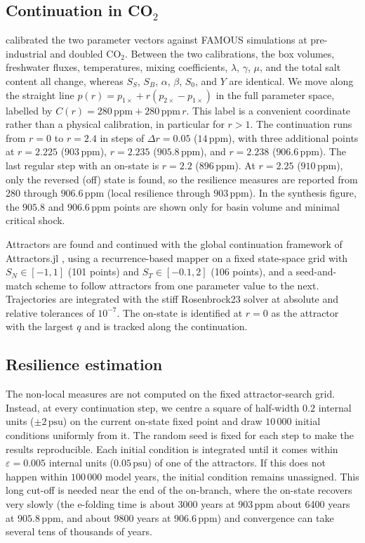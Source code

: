 \documentclass[12pt, a4paper]{article}
\newcommand{\psu}{\,\text{psu}}
\newcommand{\CO}{CO\ensuremath{_2}}
\begin{document}
\subsection*{Continuation in \CO{}}

\citet{Wood20195BoxModel} calibrated the two parameter vectors against FAMOUS simulations at pre-industrial and doubled \CO{}. Between the two calibrations, the box volumes, freshwater fluxes, temperatures, mixing coefficients, $\lambda$, $\gamma$, $\mu$, and the total salt content all change, whereas $S_S$, $S_B$, $\alpha$, $\beta$, $S_0$, and $Y$ are identical. We move along the straight line $p(r)=p_{1\times}+r(p_{2\times}-p_{1\times})$ in the full parameter space, labelled by $C(r)=280\,\text{ppm}+280\,\text{ppm}\,r$. This label is a convenient coordinate rather than a physical calibration, in particular for $r>1$. The continuation runs from $r=0$ to $r=2.4$ in steps of $\Delta r=0.05$ ($14\,\text{ppm}$), with three additional points at $r=2.225$ ($903\,\text{ppm}$), $r=2.235$ ($905.8\,\text{ppm}$), and $r=2.238$ ($906.6\,\text{ppm}$). The last regular step with an on-state is $r=2.2$ ($896\,\text{ppm}$). At $r=2.25$ ($910\,\text{ppm}$), only the reversed (off) state is found, so the resilience measures are reported from 280 through $906.6\,\text{ppm}$ (local resilience through $903\,\text{ppm}$). In the synthesis figure, the $905.8$ and $906.6\,\text{ppm}$ points are shown only for basin volume and minimal critical shock.

Attractors are found and continued with the global continuation framework of Attractors.jl \citep{Datseris2023FrameworkGlobalStability}, using a recurrence-based mapper on a fixed state-space grid with $S_N\in[-1,1]$ (101 points) and $S_T\in[-0.1,2]$ (106 points), and a seed-and-match scheme to follow attractors from one parameter value to the next. Trajectories are integrated with the stiff Rosenbrock23 solver at absolute and relative tolerances of $10^{-7}$. The on-state is identified at $r=0$ as the attractor with the largest $q$ and is tracked along the continuation.

\subsection*{Resilience estimation}

The non-local measures are not computed on the fixed attractor-search grid. Instead, at every continuation step, we centre a square of half-width $0.2$ internal units ($\pm2\psu{}$) on the current on-state fixed point and draw $10\,000$ initial conditions uniformly from it. The random seed is fixed for each step to make the results reproducible. Each initial condition is integrated until it comes within $\varepsilon=0.005$ internal units ($0.05\psu{}$) of one of the attractors. If this does not happen within $100\,000$ model years, the initial condition remains unassigned. This long cut-off is needed near the end of the on-branch, where the on-state recovers very slowly (the e-folding time is about 3000 years at $903\,\text{ppm}$ about 6400 years at $905.8\,\text{ppm}$, and about 9800 years at $906.6\,\text{ppm}$) and convergence can take several tens of thousands of years.
\end{document}
